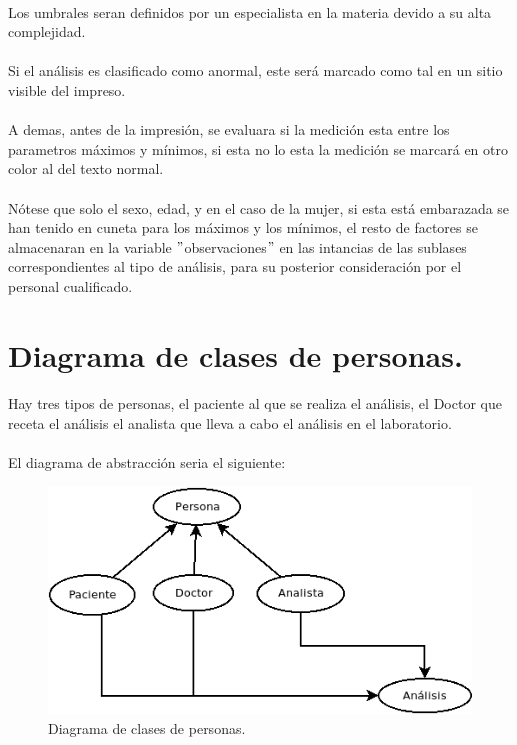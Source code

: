 \documentclass[a4paper,10pt]{article}
\begin{document}
\paragraph{}
Los umbrales seran definidos por un especialista en la materia devido a su alta complejidad.
\paragraph{}
Si el análisis es clasificado como anormal, este será marcado como tal en un sitio visible del impreso.
\paragraph{}
A demas, antes de la impresión, se evaluara si la medición esta entre los parametros máximos y mínimos, si esta no lo esta la medición se marcará en otro color al del texto normal.
\paragraph{}
Nótese que solo el sexo, edad, y en el caso de la mujer, si esta está embarazada se han tenido en cuneta para los máximos y los mínimos, el resto de factores se almacenaran en la variable $"$observaciones$"$ en las intancias de las sublases correspondientes al tipo de análisis, para su posterior consideración por el personal cualificado.
\pagebreak

\section{Diagrama de clases de personas.}
\paragraph{}
Hay tres tipos de personas, el paciente al que se realiza el análisis, el Doctor que receta el análisis el analista que lleva a cabo el análisis en el laboratorio.
\paragraph{}
El diagrama de abstracción seria el siguiente:
\vspace{0.5cm}
\begin{center}
	\begin{figure}[hbt]
		\includegraphics[width=\textwidth]{img/personas.png}
		\caption{Diagrama de clases de personas.}
		\label{fig:diagramapersonas}
	\end{figure}
\end{center}
\end{document}
